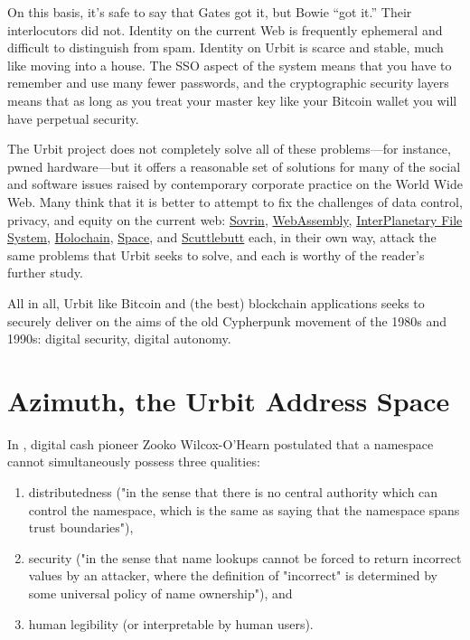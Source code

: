 {{{{On this basis, it's safe to say that Gates got it, but Bowie ``got it.''  Their interlocutors did not.}
Identity on the current Web is frequently ephemeral and difficult to distinguish from spam.  Identity on Urbit is scarce and stable, much like moving into a house.  The SSO aspect of the system means that you have to remember and use many fewer passwords, and the cryptographic security layers means that as long as you treat your master key like your Bitcoin wallet you will have perpetual security.

The Urbit project does not completely solve all of these problems—for instance, pwned hardware—but it offers a reasonable set of solutions for many of the social and software issues raised by contemporary corporate practice on the World Wide Web.  Many think that it is better to attempt to fix the challenges of data control, privacy, and equity on the current web: \href{https://sovrin.org/}{Sovrin}, \href{https://webassembly.org/}{WebAssembly}, \href{https://ipfs.io/}{InterPlanetary File System}, \href{https://holochain.org/}{Holochain}, \href{https://blog.space.storage/posts/Introducing-Space}{Space}, and \href{https://scuttlebutt.nz/}{Scuttlebutt} each, in their own way, attack the same problems that Urbit seeks to solve, and each is worthy of the reader's further study.

All in all, Urbit like Bitcoin and (the best) blockchain applications seeks to securely deliver on the aims of the old Cypherpunk movement of the 1980s and 1990s:  digital security, digital autonomy.


\section{Azimuth, the Urbit Address Space}



In \citeyear{Zooko2001}, digital cash pioneer Zooko Wilcox-O'Hearn postulated that a namespace cannot simultaneously possess three qualities:

\begin{enumerate}
	\item  distributedness ("in the sense that there is no central authority which can control the namespace, which is the same as saying that the namespace spans trust boundaries"),
	\item  security ("in the sense that name lookups cannot be forced to return incorrect values by an attacker, where the definition of "incorrect" is determined by some universal policy of name ownership"), and
	\item  human legibility (or interpretable by human users).
\end{enumerate}

}}}
